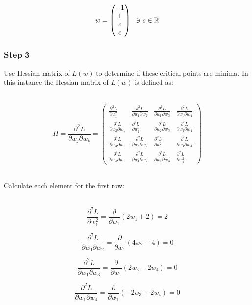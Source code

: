 \documentclass{article}
\begin{document}
$$
w = 
\begin{pmatrix}
  -1 \\
   1 \\
   c \\
   c \\
\end{pmatrix}
\hspace{0.2cm} \ni c \in \mathbb{R}
$$
\subsubsection*{Step 3}
\parbox{\textwidth}{
Use Hessian matrix of $L(w)$ to determine if these critical points are minima. In this instance the Hessian matrix of $L(w)$ is defined as:
}\\

$$H = \frac{\partial^{2} L}{\partial w_j \partial w_k }= \begin{pmatrix} 
\frac{\partial^2 L}{\partial w_1^2} & \frac{\partial^2 L}{\partial w_1 \partial w_2} & \frac{\partial^2 L}{\partial w_1 \partial w_3} & \frac{\partial^2 L}{\partial w_1 \partial w_4} \\
\frac{\partial^2 L}{\partial w_2 \partial w_1} & \frac{\partial^2 L}{\partial w_2^2} & \frac{\partial^2 L}{\partial w_2 \partial w_3} & \frac{\partial^2 L}{\partial w_2 \partial w_4} \\
\frac{\partial^2 L}{\partial w_3 \partial w_1} & \frac{\partial^2 L}{\partial w_3 \partial w_2} & \frac{\partial^2 L}{\partial w_3^2} & \frac{\partial^2 L}{\partial w_3 \partial w_4} \\
\frac{\partial^2 L}{\partial w_4 \partial w_1} & \frac{\partial^2 L}{\partial w_4 \partial w_2} & \frac{\partial^2 L}{\partial w_4 \partial w_3} & \frac{\partial^2 L}{\partial w_4^2}
\end{pmatrix}$$\\

\parbox{\textwidth}{
Calculate each element for the first row:
}\\

$$\frac{\partial^2 L}{\partial w_1^2} = \frac{\partial}{\partial w_1}(2w_1 + 2) = 2$$

$$\frac{\partial^2 L}{\partial w_1 \partial w_2} = \frac{\partial}{\partial w_1}(4w_2 - 4) = 0$$

$$\frac{\partial^2 L}{\partial w_1 \partial w_3} = \frac{\partial}{\partial w_1}(2w_3 - 2w_4) = 0$$

$$\frac{\partial^2 L}{\partial w_1 \partial w_4} = \frac{\partial}{\partial w_1}(-2w_3 + 2w_4) = 0$$
\end{document}
